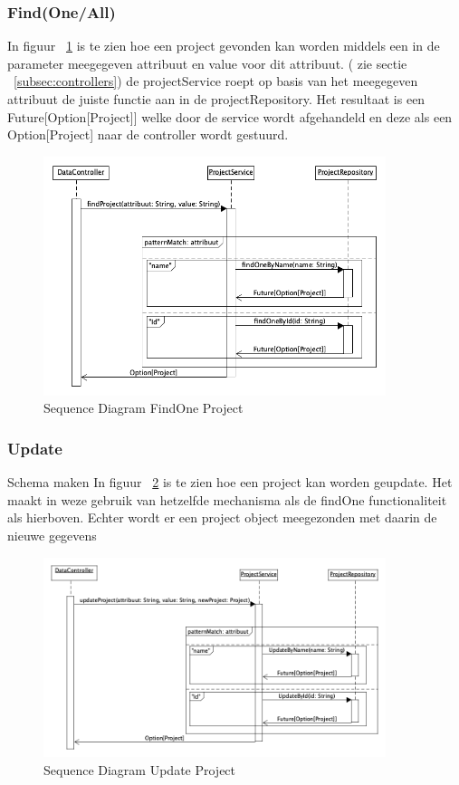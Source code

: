 \subsubsection*{Find(One/All)}
In figuur ~\ref{fig:seqdiagFindProj} is te zien hoe een project gevonden kan worden middels een in de parameter meegegeven attribuut en value voor dit attribuut. ( zie sectie ~\ref{subsec:controllers}) de projectService roept op basis van het meegegeven attribuut de juiste functie aan in de projectRepository. Het resultaat is een Future[Option[Project]] welke door de service wordt afgehandeld en deze als een Option[Project] naar de controller wordt gestuurd.
\begin{figure}[h]
    \myfloatalign
    \includegraphics[width=10cm]{gfx/umlet/exports/CRUD-FindProject}
    \caption{Sequence Diagram FindOne Project }
    \label{fig:seqdiagFindProj}
\end{figure}
\subsubsection*{Update}Schema maken
In figuur ~\ref{fig:seqdiagUpdateProj} is te zien hoe een project kan worden geupdate. Het maakt in weze gebruik van hetzelfde mechanisma als de findOne functionaliteit als hierboven. Echter wordt er een project object meegezonden met daarin de nieuwe gegevens
\begin{figure}[h]
    \myfloatalign
    \includegraphics[width=10cm]{gfx/umlet/exports/CRUD-UpdateProject}
    \caption{Sequence Diagram Update Project }
    \label{fig:seqdiagUpdateProj}
\end{figure}
